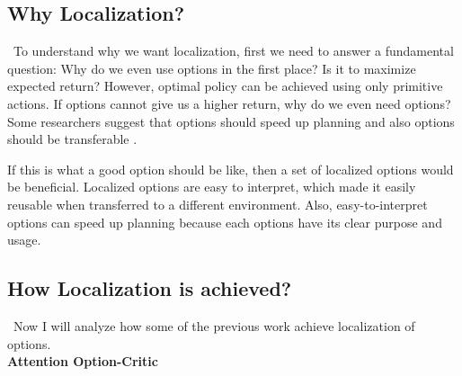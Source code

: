 \documentclass{article}
\begin{document}
	\subsection*{Why Localization?}
	\qquad \ To understand why we want localization, first we need to answer a fundamental question: Why do we even use options in the first place? Is it to maximize expected return? However, optimal policy can be achieved using only primitive actions. If options cannot give us a higher return, why do we even need options? Some researchers suggest that options should speed up planning \cite{harb2017waiting} \cite{harutyunyan2019termination} and also options should be transferable \cite{khetarpal2020options} \cite{attentionoptioncritic}.
	
	\quad If this is what a good option should be like, then a set of localized options would be beneficial. Localized options are easy to interpret, which made it easily reusable when transferred to a different environment. Also, easy-to-interpret options can speed up planning because each options have its clear purpose and usage.
	\subsection*{How Localization is achieved?}
	\qquad \ Now I will analyze how some of the previous work achieve localization of options.\vspace{0.15in}\\
	\large{\bfseries{Attention Option-Critic}}\vspace{0.05in}
	
\end{document}

